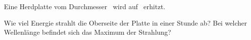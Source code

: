 Eine Herdplatte vom Durchmesser \dPO\ wird auf \tPO\ erhitzt.
\begin{abcliste}
\abc Wie viel Energie strahlt die Oberseite der Platte in einer Stunde ab?
\abc Bei welcher Wellenlänge befindet sich das Maximum der Strahlung?
\end{abcliste}
